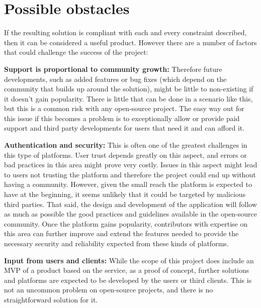 \section{Possible obstacles}
If the resulting solution is compliant with each and every constraint described, then it can be considered a useful product. However there are a number of factors that could challenge the success of the project:

\begin{addmargin}[1em]{0em}
\textbf{Support is proportional to community growth:}
Therefore future developments, such as added features or bug fixes (which depend on the community that builds up around the solution), might be little to non-existing if it doesn’t gain popularity. There is little that can be done in a scenario like this, but this is a common risk with any open-source project. The easy way out for this issue if this becomes a problem is to exceptionally allow or provide paid support and third party developments for users that need it and can afford it.

\textbf{Authentication and security:}
This is often one of the greatest challenges in this type of platforms. User trust depends greatly on this aspect, and errors or bad practices in this area might prove very costly. Issues in this aspect might lead to users not trusting the platform and therefore the project could end up without having a community. However, given the small reach the platform is expected to have at the beginning, it seems unlikely that it could be targeted by malicious third parties. That said, the design and development of the application will follow as much as possible the good practices and guidelines available in the open-source community. Once the platform gains popularity, contributors with expertise on this area can further improve and extend the features needed to provide the necessary security and reliability expected from these kinds of platforms.

\textbf{Input from users and clients:}
While the scope of this project does include an MVP of a product based on the service, as a proof of concept, further solutions and platforms are expected to be developed by the users or third clients. This is not an uncommon problem on open-source projects, and there is no straightforward solution for it.
\end{addmargin}